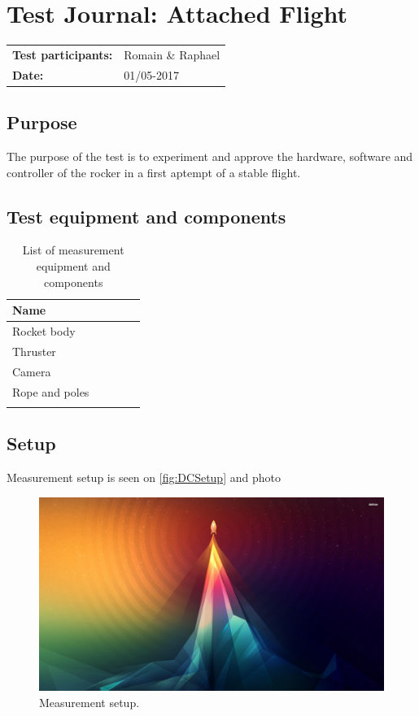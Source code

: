 \graphicspath{{figures/design/}}


			\chapter{Test Journal: Attached Flight}



\begin{table}[!h]
\begin{tabular}{l l}
\textbf{Test participants:} & Romain \& Raphael   \\
\textbf{Date:}  & 01/05-2017
\end{tabular}
\end{table}




	\section*{Purpose}
The purpose of the test is to experiment and approve the hardware, software and controller of the rocker in a first aptempt of a stable flight.




	\section*{Test equipment and components}
\begin{table}[h]
	\centering
	\caption{List of measurement equipment and components}\label{tab_appendix:template}

	\begin{tabularx}{\textwidth}{lXXXX}
		Name 				 									\\ \toprule \rowcolor{lightGrey}
		Rocket body		\\
		Thruster	\\ 
		Camera 	\\
		Rope and poles \\ \rowcolor{lightGrey}
	\end{tabularx}
\end{table}




	\section*{Setup}
Measurement setup is seen on \autoref{fig:DCSetup} and photo \
\begin{figure} [h]
\centering
\includegraphics[width=0.6\linewidth]{figures/frontpage.jpg}
\caption{Measurement setup.}
\label{fig:DCSetup}
\end{figure}


